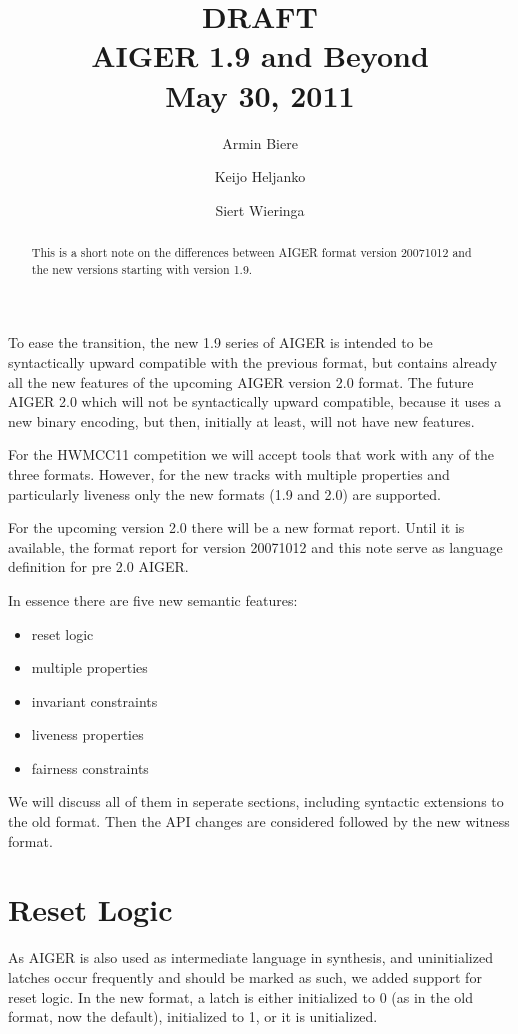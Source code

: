 \documentclass{llncs}
\title{
{\color{blue}\large DRAFT}\\
  AIGER 1.9 and Beyond \\
{\color{blue}\large May 30, 2011}}
\author{Armin Biere\inst{1} \and
Keijo Heljanko\inst{2} \and
Siert Wieringa\inst{2}}
\institute{Johannes Kepler University, Austria \and Alto University, Finland}
\begin{document}
\maketitle
\begin{abstract}
This is a short note on the differences between AIGER format version 20071012
and the new versions starting with version 1.9.
\end{abstract}
To ease the transition, the new 1.9 series of AIGER is intended to be
syntactically upward compatible with the previous format, but contains
already all the new features of the upcoming AIGER version 2.0 format.  The
future AIGER 2.0 which will not be syntactically upward compatible, because
it uses a new binary encoding, but then, initially at least, will not have
new features.

For the HWMCC11 competition we will accept tools that work with any of
the three formats.  However, for the new tracks with multiple properties and 
particularly liveness only the new formats (1.9 and 2.0) are supported.

For the upcoming version 2.0 there will be a new format report. Until it is
available, the format report for version 20071012 and this note serve as
language definition for pre 2.0 AIGER.  

In essence there are five new semantic features:

\begin{itemize}
\item reset logic
\item multiple properties
\item invariant constraints
\item liveness properties
\item fairness constraints
\end{itemize}

We will discuss all of them in seperate sections, including syntactic
extensions to the old format.   Then the API changes are considered followed
by the new witness format.

\section{Reset Logic}

As AIGER is also used as intermediate language in synthesis, and
uninitialized latches occur frequently and should be marked as such, we
added support for reset logic.  In the new format, a latch is either
initialized to 0 (as in the old format, now the default), initialized to 1,
or it is unitialized.
\end{document}
